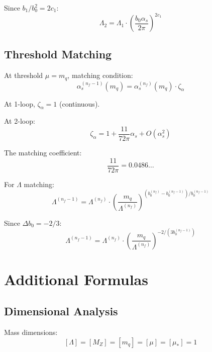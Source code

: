 \documentclass[11pt,a4paper]{article}
\theoremstyle{definition}
\begin{document}
Since $b_1/b_0^2 = 2c_1$:
\begin{equation}
\label{eq:app-13}
\Lambda_2 = \Lambda_1 \cdot \left(\frac{b_0\alpha_s}{2\pi}\right)^{2c_1}
\end{equation}

\subsection{Threshold Matching}
\label{subsec:app-threshold}

At threshold $\mu = m_q$, matching condition:
\begin{equation}
\label{eq:app-14}
\alpha_s^{(n_f-1)}(m_q) = \alpha_s^{(n_f)}(m_q) \cdot \zeta_\alpha
\end{equation}

At 1-loop, $\zeta_\alpha = 1$ (continuous).

At 2-loop:
\begin{equation}
\label{eq:app-15}
\zeta_\alpha = 1 + \frac{11}{72\pi}\alpha_s + O(\alpha_s^2)
\end{equation}

The matching coefficient:
\begin{equation}
\label{eq:app-16}
\frac{11}{72\pi} = 0.0486\ldots
\end{equation}

For $\Lambda$ matching:
\begin{equation}
\label{eq:app-17}
\Lambda^{(n_f-1)} = \Lambda^{(n_f)} \cdot \left(\frac{m_q}{\Lambda^{(n_f)}}\right)^{(b_0^{(n_f)} - b_0^{(n_f-1)})/b_0^{(n_f-1)}}
\end{equation}

Since $\Delta b_0 = -2/3$:
\begin{equation}
\label{eq:app-18}
\Lambda^{(n_f-1)} = \Lambda^{(n_f)} \cdot \left(\frac{m_q}{\Lambda^{(n_f)}}\right)^{-2/(3b_0^{(n_f-1)})}
\end{equation}

\section{Additional Formulas}
\label{app:additional}

\subsection{Dimensional Analysis}
\label{subsec:app-dim}

Mass dimensions:
\begin{equation}
\label{eq:app-19}
[\Lambda] = [M_Z] = [m_q] = [\mu] = [\mu_*] = 1
\end{equation}
\end{document}
